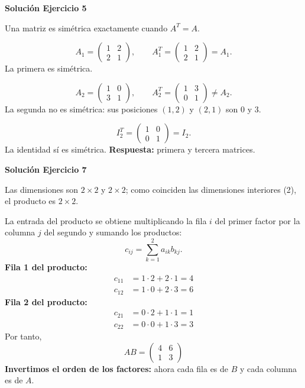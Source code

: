 \documentclass[12pt]{article}
\theoremstyle{remark}
\begin{document}
\par\bigskip\noindent\textbf{Solución Ejercicio 5}\par\nobreak
Una matriz es simétrica exactamente cuando $A^T=A$.

\[
A_1=\begin{pmatrix}1&2\\2&1\end{pmatrix},\qquad A_1^T=\begin{pmatrix}1&2\\2&1\end{pmatrix}=A_1.
\]
La primera es simétrica.

\[
A_2=\begin{pmatrix}1&0\\3&1\end{pmatrix},\qquad A_2^T=\begin{pmatrix}1&3\\0&1\end{pmatrix}\ne A_2.
\]
La segunda no es simétrica: sus posiciones $(1,2)$ y $(2,1)$ son $0$ y $3$.

\[
I_2^T=\begin{pmatrix}1&0\\0&1\end{pmatrix}=I_2.
\]
La identidad sí es simétrica. \textbf{Respuesta:} primera y tercera matrices.


\par\bigskip\noindent\textbf{Solución Ejercicio 7}\par\nobreak
Las dimensiones son $2\times2$ y $2\times2$; como coinciden las dimensiones interiores (2), el producto es $2\times2$.

La entrada del producto se obtiene multiplicando la fila $i$ del primer factor por la columna $j$ del segundo y sumando los productos:
\[
c_{ij}=\sum_{k=1}^{2} a_{ik}b_{kj}.
\]
\textbf{Fila 1 del producto:}
\[
\begin{aligned}c_{11}&=1\cdot 2+2\cdot 1=4\\c_{12}&=1\cdot 0+2\cdot 3=6\end{aligned}
\]
\textbf{Fila 2 del producto:}
\[
\begin{aligned}c_{21}&=0\cdot 2+1\cdot 1=1\\c_{22}&=0\cdot 0+1\cdot 3=3\end{aligned}
\]
Por tanto,
\[
\boxed{AB=\begin{pmatrix}4&6\\1&3\end{pmatrix}}
\]
\textbf{Invertimos el orden de los factores:} ahora cada fila es de $B$ y cada columna es de $A$.
\end{document}
